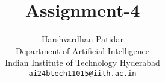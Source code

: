 \documentclass{article}
\title{Assignment-4}
\author{Harshvardhan Patidar\\
  Department of Artificial Intelligence\\
  Indian Institute of Technology Hyderabad\\
  \texttt{ai24btech11015@iith.ac.in}
}
\begin{document}
\



\maketitle






















\end{document}
